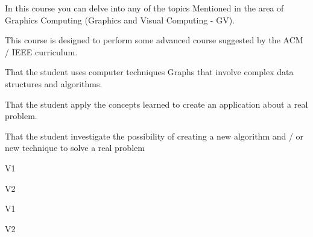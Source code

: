 \begin{syllabus}


\begin{justification}
In this course you can delve into any of the topics
Mentioned in the area of Graphics Computing (Graphics and Visual Computing - GV).

This course is designed to perform some advanced course suggested by the ACM / IEEE curriculum. \cite{Foley13,Hearn90}
\end{justification}

\begin{goals}
\item That the student uses computer techniques Graphs that involve complex data structures and algorithms.
\item That the student apply the concepts learned to create an application about a real problem.
\item That the student investigate the possibility of creating a new algorithm and / or new technique to solve a real problem
\end{goals}

\begin{outcomes}{V1}
    \item {}
    \item {}
    \item {}
    \item {}
\end{outcomes}

\begin{outcomes}{V2}
    \item {}
    \item {}
    \item {}
    \item {}
\end{outcomes}

\begin{competences}{V1}
    \item {}
    \item {}
\end{competences}

\begin{competences}{V2}
    \item {}
    \item {}
\end{competences}


\end{syllabus}
